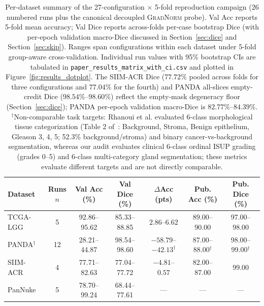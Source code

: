 \documentclass[preprint,12pt]{elsarticle}
\begin{document}
\begin{table}[!tbp]
\centering
\scriptsize
\setlength{\tabcolsep}{1pt}
\caption{Per-dataset summary of the 27-configuration $\times$ 5-fold reproduction campaign (26 numbered runs plus the canonical decoupled \textsc{GradNorm} probe). Val Acc reports 5-fold mean accuracy; Val Dice reports across-folds per-case bootstrap Dice (with per-epoch validation macro-Dice discussed in Section~\ref{sec:dice} and Section~\ref{sec:skip}). Ranges span configurations within each dataset under 5-fold group-aware cross-validation. Individual run values with 95\% bootstrap CIs are tabulated in \texttt{paper\_results\_matrix\_with\_ci.csv} and plotted in Figure~\ref{fig:results_dotplot}. The SIIM-ACR Dice ($77.72\%$ pooled across folds for three configurations and $77.04\%$ for the fourth) and PANDA all-slices empty-credit Dice ($98.54\%$--$98.60\%$) reflect the empty-mask degeneracy floor (Section~\ref{sec:dice}); PANDA per-epoch validation macro-Dice is $82.77\%$--$84.39\%$. $^\dagger$Non-comparable task targets: Rhanoui et al. evaluated 6-class morphological tissue categorization (Table 2 of~\cite{rhanoui2025multitask}: Background, Stroma, Benign epithelium, Gleason 3, 4, 5; 52.3\% background/stroma) and binary cancer-vs-background segmentation, whereas our audit evaluates clinical 6-class ordinal ISUP grading (grades 0--5) and 6-class multi-category gland segmentation; these metrics evaluate different targets and are not directly comparable.}
\label{tab:results_matrix}
\begin{tabular}{@{}l c c c c c c@{}}
\toprule
\textbf{Dataset} & \textbf{Runs $n$} & \textbf{Val Acc (\%)} & \textbf{Val Dice (\%)} & \textbf{$\Delta$Acc (pts)} & \textbf{Pub. Acc (\%)} & \textbf{Pub. Dice (\%)} \\
\midrule
TCGA-LGG & 5 & 92.86--95.62 & 85.33--88.85 & $2.86$--$6.62$ & 89.00--90.00 & 97.00--98.00 \\
PANDA$^\dagger$ & 12 & 28.21--44.87 & 98.54--98.60 & $-58.79$--$-42.13^\dagger$ & 87.00--88.00$^\dagger$ & 98.00--99.00$^\dagger$ \\
SIIM-ACR & 4 & 77.71--82.63 & 77.04--77.72 & $-4.81$--$0.57$ & 82.00--87.00 & 99.00 \\
PanNuke & 5 & 78.70--99.24 & 68.44--77.61 & --- & --- & --- \\
\bottomrule
\end{tabular}
\end{table}
\end{document}
